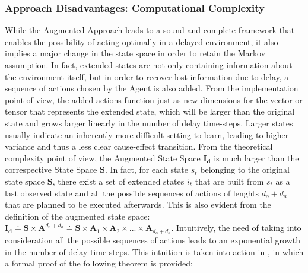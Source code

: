             \subsubsection{Approach Disadvantages: Computational Complexity}
                While the Augmented Approach leads to a sound and complete framework that enables the possibility of acting optimally in a delayed environment, it also implies a major change in the state space in order to retain the Markov assumption. In fact, extended states are not only containing information about the environment itself, but in order to recover lost information due to delay, a sequence of actions chosen by the Agent is also added. \newline
                From the implementation point of view, the added actions function just as new dimensions for the vector or tensor that represents the extended state, which will be larger than the original state and grows larger linearly in the number of delay time-steps. Larger states usually indicate an inherently more difficult setting to learn, leading to higher variance and thus a less clear cause-effect transition. From the theoretical complexity point of view, the Augmented State Space $\mathbf{I_d}$ is much larger than the correspective State Space $\mathbf{S}$. In fact, for each state $s_t$ belonging to the original state space $\mathbf{S}$, there exist a set of extended states $i_t$ that are built from $s_t$ as a last observed state and all the possible sequences of actions of lenghts $d_o+d_a$ that are planned to be executed afterwards. This is also evident from the definition of the augmented state space: $\mathbf{I_d} \doteq \mathbf{S} \times \mathbf{A}^{d_o+d_a} \doteq \mathbf{S} \times \mathbf{A}_{1} \times \mathbf{A}_{2} \times ... \times \mathbf{A}_{d_o+d_a}$. Intuitively, the need of taking into consideration all the possible sequences of actions leads to an exponential growth in the number of delay time-steps. This intuition is taken into action in , in which a formal proof of the following theorem is provided:
                
